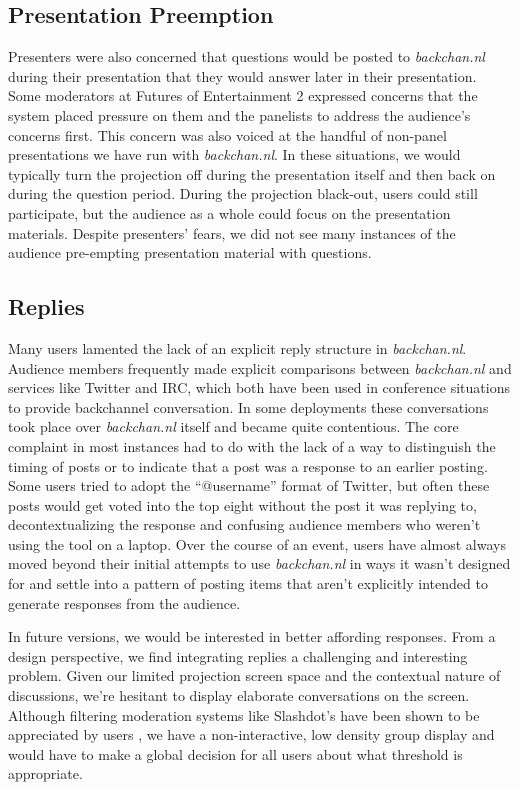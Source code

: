 \subsection{Presentation Preemption}
Presenters were also concerned that questions would be posted to \emph{backchan.nl} during their presentation that they would answer later in their presentation. Some moderators at Futures of Entertainment 2 expressed concerns that the system placed pressure on them and the panelists to address the audience's concerns first. This concern was also voiced at the handful of non-panel presentations we have run with \emph{backchan.nl}. In these situations, we would typically turn the projection off during the presentation itself and then back on during the question period. During the projection black-out, users could still participate, but the audience as a whole could focus on the presentation materials. Despite presenters' fears, we did not see many instances of the audience pre-empting presentation material with questions.


\subsection{Replies}

Many users lamented the lack of an explicit reply structure in \emph{backchan.nl}. Audience members frequently made explicit comparisons between \emph{backchan.nl} and services like Twitter and IRC, which both have been used in conference situations to provide backchannel conversation. In some deployments these conversations took place over \emph{backchan.nl} itself and became quite contentious. The core complaint in most instances had to do with the lack of a way to distinguish the timing of posts or to indicate that a post was a response to an earlier posting. Some users tried to adopt the ``@username'' format of Twitter, but often these posts would get voted into the top eight without the post it was replying to, decontextualizing the response and confusing audience members who weren't using the tool on a laptop. Over the course of an event, users have almost always moved beyond their initial attempts to use \emph{backchan.nl} in ways it wasn't designed for and settle into a pattern of posting items that aren't explicitly intended to generate responses from the audience. 

In future versions, we would be interested in better affording responses. From a design perspective, we find integrating replies a challenging and interesting problem. Given our limited projection screen space and the contextual nature of discussions, we're hesitant to display elaborate conversations on the screen. Although filtering moderation systems like Slashdot's have been shown to be appreciated by users \citep{Ratto:2003vs}, we have a non-interactive, low density group display and would have to make a global decision for all users about what threshold is appropriate.

